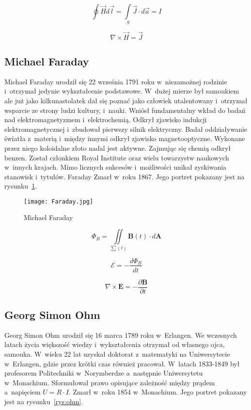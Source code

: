 \begin{equation}
    \oint \vec{H} d\vec{l} = \int\limits_{S} \vec{J} \cdot d \vec{a} = I
\end{equation}

\begin{equation}
    \nabla \times \vec{H} = \vec{J}
\end{equation}

\subsection{Michael Faraday}
Michael Faraday urodził się 22 września 1791 roku w~niezamożnej rodzinie i~otrzymał jedynie wykształcenie podstawowe. W~dużej mierze był samoukiem ale już jako kilkunastolatek dał się poznać jako człowiek utalentowany i~otrzymał wsparcie ze strony ludzi kultury, i~nauki. Wniósł fundamentalny wkład do badań nad elektromagnetyzmem i~elektrochemią. Odkrył zjawisko indukcji elektromagnetycznej i~zbudował pierwszy silnik elektryczny. Badał oddziaływanie światła z~materią i~między innymi odkrył zjawisko magnetooptyczne. Wykonane przez niego koloidalne złoto nadal jest aktywne. Zajmując się chemią odkrył benzen. Został członkiem Royal Institute oraz wielu towarzystw naukowych w~innych krajach. Mimo licznych sukcesów i~możliwości unikał zyskiwania stanowisk i~tytułów. Faraday Zmarł w~roku 1867. Jego portret pokazany jest na rysunku~\ref{rys:faraday}.

\begin{figure}[!ht]
	\centering \texttt{[image: Faraday.jpg]}
	\caption{Michael Faraday}
	\label{rys:faraday}
\end{figure}

\begin{equation*}
    \Phi_B = \iint\limits_{\sum (t)} \pmb{B}(t) \cdot d\pmb{A}
\end{equation*}

\begin{equation}
    \mathcal{E} = -\frac{d\Phi_B}{dt}
\end{equation}

 \begin{equation}
     \nabla \times \pmb{E} = - \frac{\partial \pmb{B}}{\partial t}
 \end{equation}


\subsection{Georg Simon Ohm}
Georg Simon Ohm urodził się 16 marca 1789 roku w~Erlangen. We wczesnych latach życia większość wiedzy i~wykształcenia otrzymał od własnego ojca, samouka. W~wieku 22 lat uzyskał doktorat z~matematyki na Uniwersytecie w~Erlangen, gdzie przez krótki czas również pracował. W~latach 1833-1849 był profesorem Politechniki w~Norymberdze a~następnie Uniwersytetu w~Monachium. Sformułował prawo opisujące zależność między prądem a~napięciem $U=R \cdot I$. Zmarł w~roku 1854 w~Monachium. Jego portret pokazany jest na rysunku~\ref{rys:ohm}.

